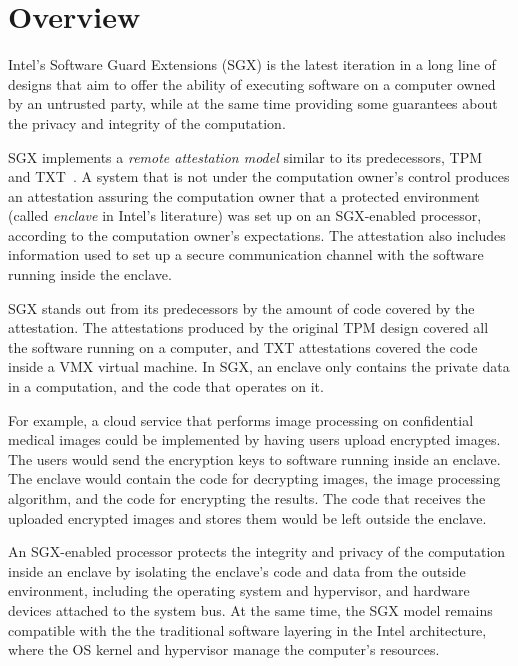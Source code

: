 \section{Overview}
\label{sec:intro}

Intel's Software Guard Extensions (SGX) is the latest iteration in a long line
of designs that aim to offer the ability of executing software on a computer
owned by an untrusted party, while at the same time providing some guarantees
about the privacy and integrity of the computation.

SGX implements a \textit{remote attestation model} similar to its predecessors,
TPM~\cite{grawrock2003tpm} and TXT~\cite{grawrock2009txt}. A system that is not
under the computation owner's control produces an attestation assuring the
computation owner that a protected environment (called \textit{enclave} in
Intel's literature) was set up on an SGX-enabled processor, according to the
computation owner's expectations. The attestation also includes information
used to set up a secure communication channel with the software running inside
the enclave.

SGX stands out from its predecessors by the amount of code covered by the
attestation. The attestations produced by the original TPM design covered all
the software running on a computer, and TXT attestations covered the code
inside a VMX \cite{uhlig2005vmx} virtual machine. In SGX, an enclave only
contains the private data in a computation, and the code that operates on it.

For example, a cloud service that performs image processing on confidential
medical images could be implemented by having users upload encrypted images.
The users would send the encryption keys to software running inside an enclave.
The enclave would contain the code for decrypting images, the image processing
algorithm, and the code for encrypting the results. The code that receives the
uploaded encrypted images and stores them would be left outside the enclave.

An SGX-enabled processor protects the integrity and privacy of the computation
inside an enclave by isolating the enclave's code and data from the outside
environment, including the operating system and hypervisor, and hardware
devices attached to the system bus. At the same time, the SGX model remains
compatible with the the traditional software layering in the Intel
architecture, where the OS kernel and hypervisor manage the computer's
resources.



